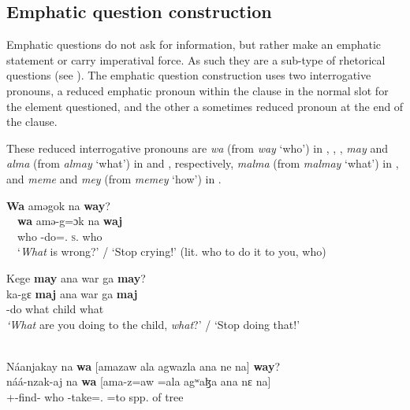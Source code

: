 \subsection{Emphatic question construction}\label{sec:10.3.5}
\hypertarget{RefHeading1213081525720847}{}
Emphatic questions do not ask for information, but rather make an emphatic statement or carry imperatival force. As such they are a sub-type of rhetorical questions (see ). The emphatic question construction uses two interrogative pronouns, a reduced emphatic pronoun within the clause in the normal slot for the element questioned, and the other a sometimes reduced pronoun at the end of the clause. 

These reduced interrogative pronouns are \textit{wa} (from \textit{way} ‘who’) in , , , \textit{may} and \textit{alma} (from \textit{almay} ‘what’) in  and , respectively, \textit{malma} (from \textit{malmay} ‘what’) in , and \textit{meme} and \textit{mey} (from \textit{memey} ‘how’) in .

\ea \label{ex:10:100}
\textbf{Wa}  aməgok  na  \textbf{way}?\\
\gll  \ \ \textbf{wa}    amə-g=ɔk  na  \textbf{waj}\\
      \ \ who    {\DEP}-do={\twoS}.{\IO}  \textsc{s}.{\DO}  who\\
\glt  \ \ ‘\textit{What} is wrong?’ / ‘Stop crying!’ (lit. who to do it to you, who) 
\z 

\ea \label{ex:10:101}
Kege  \textbf{may} ana  war  ga  \textbf{may}?\\
\gll  ka-gɛ  \textbf{maj} ana  war  ga  \textbf{maj}\\
      {\twoS}-do  what  {\DAT} child  {\ADJ}  what\\
\glt  \textit{‘What} are you doing to the child, \textit{what}?’ / ‘Stop doing that!’
\z 

\ea \label{ex:10:102}
\\
Náanjakay  na  \textbf{wa}  [amazaw  ala  agwazla  ana  ne   na]  \textbf{way}?\\
\gll  náá-nzak-aj     na  \textbf{wa}    [ama-z=aw   =ala  agʷaɮa    ana   nɛ    na] \\    
      {\oneS}+{\POT}{}-find{}-{\CL} {\PSP} who   {\DEP}-take={\oneS}.{\IO}   =to    {spp. of tree}     {\DAT} {\oneS}    {\PSP}\\   
      
